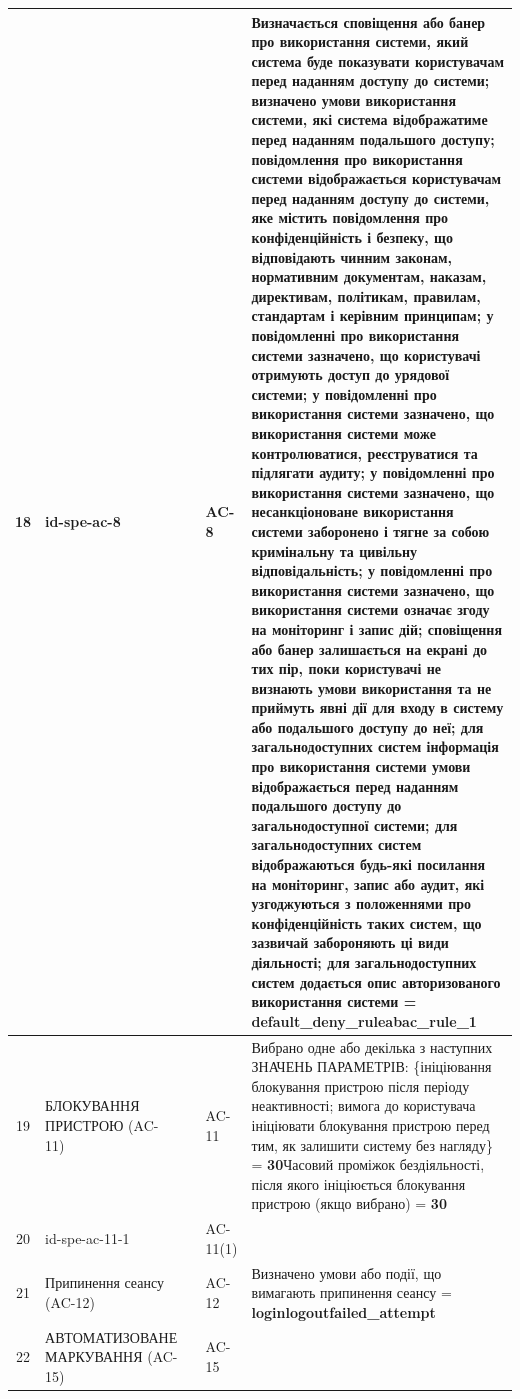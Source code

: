 \documentclass[10pt]{article}
\begin{document}
\begin{longtable}{|c|>{\raggedright\arraybackslash}p{4cm}|>{\raggedright\arraybackslash}p{2.5cm}|>{\raggedright\arraybackslash}p{3.5cm}|>{\raggedright\arraybackslash}p{5.5cm}|}
18 & id-spe-ac-8 &  & AC-8 & Визначається сповіщення або банер про використання системи, який система буде показувати користувачам перед наданням доступу до системи; визначено умови використання системи, які система відображатиме перед наданням подальшого доступу; повідомлення про використання системи відображається користувачам перед наданням доступу до системи, яке містить повідомлення про конфіденційність і безпеку, що відповідають чинним законам, нормативним документам, наказам, директивам, політикам, правилам, стандартам і керівним принципам; у повідомленні про використання системи зазначено, що користувачі отримують доступ до урядової системи; у повідомленні про використання системи зазначено, що використання системи може контролюватися, реєструватися та підлягати аудиту; у повідомленні про використання системи зазначено, що несанкціоноване використання системи заборонено і тягне за собою кримінальну та цивільну відповідальність; у повідомленні про використання системи зазначено, що використання системи означає згоду на моніторинг і запис дій; сповіщення або банер залишається на екрані до тих пір, поки користувачі не визнають умови використання та не приймуть явні дії для входу в систему або подальшого доступу до неї; для загальнодоступних систем інформація про використання системи умови відображається перед наданням подальшого доступу до загальнодоступної системи; для загальнодоступних систем відображаються будь-які посилання на моніторинг, запис або аудит, які узгоджуються з положеннями про конфіденційність таких систем, що зазвичай забороняють ці види діяльності; для загальнодоступних систем додається опис авторизованого використання системи = \textbf{default\_\allowbreak{}deny\_\allowbreak{}ruleabac\_\allowbreak{}rule\_\allowbreak{}1} \\ \hline
19 & БЛОКУВАННЯ ПРИСТРОЮ (AC-11) &  & AC-11 & Вибрано одне або декілька з наступних ЗНАЧЕНЬ ПАРАМЕТРІВ: \{ініціювання блокування пристрою після періоду неактивності; вимога до користувача ініціювати блокування пристрою перед тим, як залишити систему без нагляду\} = \textbf{30}\newline Часовий проміжок бездіяльності, після якого ініціюється блокування пристрою (якщо вибрано) = \textbf{30} \\ \hline
20 & id-spe-ac-11-1 &  & AC-11(1) &  \\ \hline
21 & Припинення сеансу (AC-12) &  & AC-12 & Визначено умови або події, що вимагають припинення сеансу = \textbf{loginlogoutfailed\_\allowbreak{}attempt} \\ \hline
22 & АВТОМАТИЗОВАНЕ МАРКУВАННЯ (AC-15) &  & AC-15 &  \\ \hline

\end{longtable}
\end{document}
